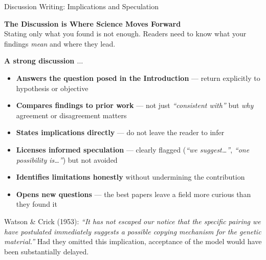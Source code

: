\documentclass{beamer}
\begin{document}
\begin{frame}{Discussion Writing: Implications and Speculation}

  \footnotesize
  \textbf{The Discussion is Where Science Moves Forward}\\
  \smallskip
  Stating only what you found is not enough. Readers need to know
  what your findings \emph{mean} and where they lead.

  \medskip
  \textbf{A strong discussion $\ldots$}
  \begin{itemize}
    \item \textbf{Answers the question posed in the Introduction }---
      return explicitly to hypothesis or objective
    \item \textbf{Compares findings to prior work} --- not just
      \textit{``consistent with''} but \textit{why} agreement
      or disagreement matters
    \item \textbf{States implications directly} --- do not leave
      the reader to infer
    \item \textbf{Licenses informed speculation} --- clearly flagged
      (\textit{``we suggest\ldots''}, \textit{``one possibility
      is\ldots''}) but not avoided
    \item \textbf{Identifies limitations honestly} without
      undermining the contribution
    \item \textbf{Opens new questions} --- the best papers leave
      a field more curious than they found it
  \end{itemize}

  \medskip
  Watson \& Crick (1953): \textit{``It has not escaped
  our notice that the specific pairing we have postulated immediately
  suggests a possible copying mechanism for the genetic material.''}
  Had they omitted this implication, acceptance of the model
  would have been substantially delayed.

\end{frame}
\end{document}
